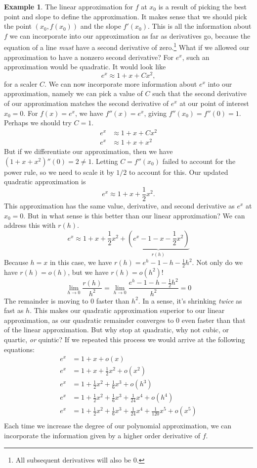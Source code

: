 \documentclass{article}
\theoremstyle{definition}
\newtheorem{example}{Example}[section]
\begin{document}
\begin{example}
The linear approximation for $ f $ at $ x_0 $ is a result of picking the best point and slope to define the approximation. It makes sense that we should pick the point $ (x_0,f(x_0)) $ and the slope $ f'(x_0) $. This is all the information about $ f $ we can incorporate into our approximation as far as derivatives go, because the equation of a line \textit{must} have a second derivative of zero.\footnote{All subsequent derivatives will also be $ 0 $.} What if we allowed our approximation to have a nonzero second derivative? For $ e^x $, such an approximation would be quadratic. It would look like $$ e^x\approx 1+x+C x^2,$$ for a scaler $ C $. We can now incorporate more information about $ e^x $ into our approximation, namely we can pick a value of $ C $ such that the second derivative of our approximation matches the second derivative of $ e^x $ at our point of interest $ x_0=0 $. For $ f(x)=e^x $, we have $ f''(x)=e^x $, giving $ f''(x_0)=f''(0)=1 $. Perhaps we should try $ C=1 $. 
\begin{align*}
	e^x&\approx 1+x+C x^2\\
	e^x&\approx 1+x+x^2
\end{align*}
But if we differentiate our approximation, then we have $ (1+x+x^2)''(0)=2\neq 1 $. Letting $ C=f''(x_0) $ failed to account for the power rule, so we need to scale it by $ 1/2 $ to account for this. Our updated quadratic approximation is
$$ e^x\approx1+x+\frac{1}{2}x^2.$$
This approximation has the same value, derivative, and second derivative as $ e^x $ at $ x_0=0 $. But in what sense is this better than our linear approximation? We can address this with $ r(h) $.
$$ e^x\approx1+x+\frac{1}{2}x^2+\underbrace{(e^x-1-x-\frac{1}{2}x^2)}_{r(h)}$$
Because $ h=x $ in this case, we have $r(h)=e^h-1-h-\frac{1}{2}h^2 $. Not only do we have $ r(h)=o(h) $, but we have $ r(h)=o(h^2) $!
$$ \lim_{h\to 0}\frac{r(h)}{h^2}=\lim_{h\to 0}\frac{e^h-1-h-\frac{1}{2}h^2}{h^2}=0$$ The remainder is moving to $ 0 $ faster than $ h^2 $. In a sense, it's shrinking \textit{twice} as fast as $ h $.  This makes our quadratic approximation superior to our linear approximation, as our quadratic remainder converges to $ 0 $ even faster than that of the linear approximation. But why stop at quadratic, why not cubic, or quartic, \textit{or} quintic? If we repeated this process we would arrive at the following equations:
\begin{align*}
	e^x&=1+x+o(x)\\
	e^x&=1+x+\frac{1}{2}x^2+o(x^2)\\
	e^x&=1+\frac{1}{2}x^2+\frac{1}{6}x^3+o(h^3)\\
	e^x&=1+\frac{1}{2}x^2+\frac{1}{6}x^3+\frac{1}{24}x^4+o(h^4)\\
	e^x&=1+\frac{1}{2}x^2+\frac{1}{6}x^3+\frac{1}{24}x^4+\frac{1}{120}x^5+o(x^5)\\
\end{align*}
Each time we increase the degree of our polynomial approximation, we can incorporate the information given by a higher order derivative of $ f $. 
\end{example}
\end{document}
